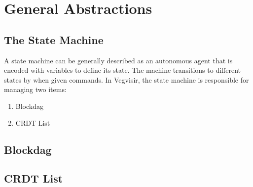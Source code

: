 
\chapter{General Abstractions}

\section{The State Machine}
\label{sec:1}
A state machine can be generally described as an autonomous agent that is
encoded with variables to define its state. The machine transitions to
different states by when given commands. In Vegvisir, the state machine is
responsible for managing two items:
\begin{enumerate}
    \item Blockdag
    \item CRDT List
\end{enumerate}


\section{Blockdag}

\section{CRDT List}
